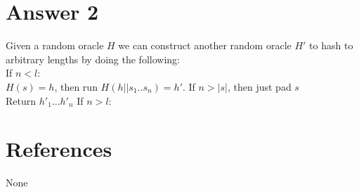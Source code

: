 \documentclass[11pt]{article}
\theoremstyle{definition}
\begin{document}
\section*{Answer 2}
Given a random oracle $H$ we can construct another random oracle $H'$ to hash to arbitrary lengths by doing the following:\\
If $n < l$:\\
$H(s) = h$, then run $H(h || s_1..s_n) = h'$.  If $n > |s|$, then just pad $s$\\
Return $h'_1...h'_n$
\newline
If $n > l$:\\



\noindent\hrulefill


\section*{References}

None
\end{document}
